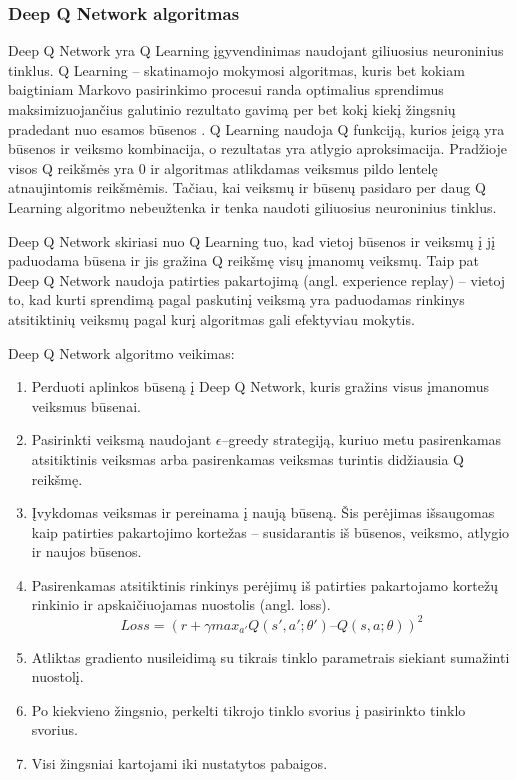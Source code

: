 \documentclass{VUMIFPSbakalaurinis}
\begin{document}
\subsubsection{Deep Q Network algoritmas}
Deep Q Network yra Q Learning įgyvendinimas naudojant giliuosius neuroninius tinklus. Q Learning – skatinamojo mokymosi algoritmas, kuris bet kokiam baigtiniam Markovo pasirinkimo procesui randa optimalius sprendimus maksimizuojančius galutinio rezultato gavimą per bet kokį kiekį žingsnių pradedant nuo esamos būsenos \cite{melo2001convergence}. 
Q Learning naudoja Q funkciją, kurios įeigą yra būsenos ir veiksmo kombinacija, o rezultatas yra atlygio aproksimacija. Pradžioje visos Q reikšmės yra 0 ir algoritmas atlikdamas veiksmus pildo lentelę atnaujintomis reikšmėmis. Tačiau, kai veiksmų ir būsenų pasidaro per daug Q Learning algoritmo nebeužtenka ir tenka naudoti giliuosius neuroninius tinklus.  

Deep Q Network skiriasi nuo Q Learning tuo, kad vietoj būsenos ir veiksmų į jį paduodama būsena ir jis gražina Q reikšmę visų įmanomų veiksmų. Taip pat Deep Q Network naudoja patirties pakartojimą (angl. experience replay) – vietoj to, kad kurti sprendimą pagal paskutinį veiksmą yra paduodamas rinkinys atsitiktinių veiksmų pagal kurį algoritmas gali efektyviau mokytis. 

Deep Q Network algoritmo veikimas\cite{handson}:
\begin{enumerate}
    \item Perduoti aplinkos būseną į Deep Q Network, kuris gražins visus įmanomus veiksmus būsenai.
    \item Pasirinkti veiksmą naudojant \(\epsilon\)–greedy strategiją, kuriuo metu pasirenkamas atsitiktinis veiksmas arba pasirenkamas veiksmas turintis didžiausia Q reikšmę.
    \item Įvykdomas veiksmas ir pereinama į naują būseną. Šis perėjimas išsaugomas kaip patirties pakartojimo kortežas – susidarantis iš būsenos, veiksmo, atlygio ir naujos būsenos.
    \item Pasirenkamas atsitiktinis rinkinys perėjimų iš patirties pakartojamo kortežų rinkinio ir apskaičiuojamas nuostolis (angl. loss). \[Loss=(r + \gamma max_{a'} Q(s',a';\theta') – Q(s,a;\theta))^2\]
    \item Atliktas gradiento nusileidimą su tikrais tinklo parametrais siekiant sumažinti nuostolį.
    \item Po kiekvieno žingsnio, perkelti tikrojo tinklo svorius į pasirinkto tinklo svorius.
    \item Visi žingsniai kartojami iki nustatytos pabaigos.
\end{enumerate}
\end{document}
